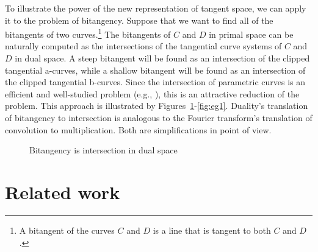 \documentclass[12pt]{article}
\begin{document}
To illustrate the power of the new representation of tangent space,
we can apply it to the problem of bitangency.
Suppose that we want to find all of the bitangents of two curves.\footnote{A bitangent
	of the curves $C$ and $D$ is a line that is tangent to 
	both $C$ and $D$.}
The bitangents of $C$ and $D$ in primal space can be naturally computed as
the intersections of the tangential curve systems of $C$ and $D$ in dual space.
A steep bitangent will be found as an
intersection of the clipped tangential a-curves, while a shallow bitangent
will be found as an intersection of the clipped tangential b-curves.
Since the intersection of parametric curves is an efficient and well-studied problem
(e.g., \cite{sederberg86}),
this is an attractive reduction of the problem.
This approach is illustrated by Figures~\ref{fig:biTang}-\ref{fig:eg1}.
Duality's translation of bitangency to intersection
is analogous to the Fourier transform's translation of convolution to multiplication.
Both are simplifications in point of view.

\begin{figure}[h]
\centerline{}
\caption{Bitangency is intersection in dual space}
\label{fig:biTang}
\end{figure}

\begin{figure*}[h]
\centerline{}
\caption{Computing bitangents in dual space}
\label{fig:eg1}
\end{figure*}



\section{Related work}
\label{sec:comparison}
\end{document}
